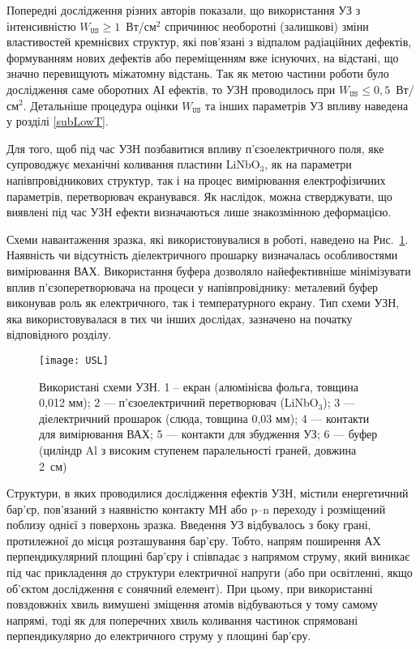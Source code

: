 Попередні дослідження різних авторів \cite{Davletova2008,Davletova2009,Pashaev2014r,Vlasov2009r} показали, що використання УЗ з інтенсивністю $W_\mathtt{US}\geq1$~Вт/см$^2$ спричинює необоротні (залишкові) зміни властивостей кремнієвих структур, які пов'язані з відпалом радіаційних дефектів, формуванням нових дефектів або переміщенням вже існуючих, на відстані, що значно перевищують міжатомну відстань.
Так як метою частини роботи було дослідження саме оборотних АІ ефектів, то УЗН проводилось при $W_\mathtt{US} \leq 0,5$~Вт/см$^2$.
Детальніше процедура оцінки $W_\mathtt{US}$ та інших параметрів УЗ впливу наведена у розділі \ref{subLowT}.

Для того, щоб під час УЗН позбавитися впливу п'єзоелектричного поля, яке супроводжує механічні коливання пластини LiNbO$_3$,  як на параметри напівпровідникових структур, так і на процес вимірювання електрофізичних параметрів,
перетворювач екранувався.
Як наслідок, можна стверджувати, що виявлені під час УЗН ефекти визначаються лише знакозмінною деформацією.

Схеми навантаження зразка, які використовувалися в роботі, наведено на Рис.~\ref{figUSL}.
Наявність чи відсутність діелектричного прошарку визначалась особливостями вимірювання ВАХ.
Використання буфера дозволяло найефективніше мінімізувати вплив п'єзоперетворювача на процеси у напівпровіднику:
металевий буфер виконував роль як електричного, так і температурного екрану.
Тип схеми УЗН, яка використовувалася в тих чи інших дослідах, зазначено на початку відповідного розділу.

\begin{figure}
\center
\texttt{[image: USL]}%
\caption{\label{figUSL}
Використані схеми УЗН.
1 --  екран (алюмінієва фольга, товщина 0,012 мм);
2 --- п'єзоелектричний перетворювач (LiNbO$_3$);
3 --- діелектричний прошарок (слюда, товщина 0,03 мм);
4 --- контакти для вимірювання ВАХ;
5 --- контакти для збудження УЗ;
6 --- буфер (циліндр Al з високим ступенем паралельності граней, довжина 2~см)
}
\end{figure}

Структури, в яких проводилися дослідження ефектів УЗН, містили енергетичний бар'єр, пов'язаний з наявністю контакту МН або p--n переходу і розміщений поблизу однієї з поверхонь зразка.
Введення УЗ відбувалось з боку грані, протилежної до місця розташування бар'єру.
Тобто, напрям поширення АХ перпендикулярний площині бар'єру і співпадає з напрямом струму, який виникає під час прикладення до структури електричної напруги (або при освітленні, якщо об'єктом дослідження є сонячний елемент).
При цьому, при використанні повздовжніх хвиль вимушені зміщення атомів відбуваються у тому самому напрямі, тоді як для поперечних хвиль коливання частинок спрямовані перпендикулярно до електричного струму у площині бар'єру.


